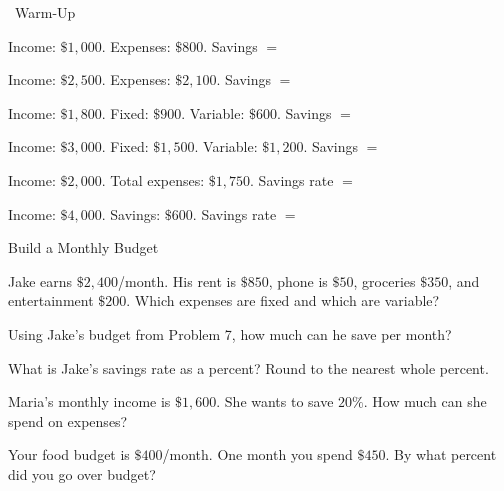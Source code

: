 \begin{practiceBox}[funGreen]{\faSun~Warm-Up}


\begin{multicols}{2}
\prob Income: $\$1{,}000$. Expenses: $\$800$. Savings $=$ \answerBlank[2cm]

\prob Income: $\$2{,}500$. Expenses: $\$2{,}100$. Savings $=$ \answerBlank[2cm]

\prob Income: $\$1{,}800$. Fixed: $\$900$. Variable: $\$600$. Savings $=$ \answerBlank[2cm]

\prob Income: $\$3{,}000$. Fixed: $\$1{,}500$. Variable: $\$1{,}200$. Savings $=$ \answerBlank[2cm]

\prob Income: $\$2{,}000$. Total expenses: $\$1{,}750$. Savings rate $=$ \answerBlank[2cm]

\prob Income: $\$4{,}000$. Savings: $\$600$. Savings rate $=$ \answerBlank[2cm]
\end{multicols}
\end{practiceBox}

\begin{practiceBox}{Build a Monthly Budget}

\prob Jake earns $\$2{,}400$/month. His rent is $\$850$, phone is $\$50$, groceries $\$350$, and entertainment $\$200$. Which expenses are fixed and which are variable? \answerBlank[5cm]

\prob Using Jake's budget from Problem 7, how much can he save per month? \answerBlank[3cm]

\prob What is Jake's savings rate as a percent? Round to the nearest whole percent. \answerBlank[3cm]

\prob Maria's monthly income is $\$1{,}600$. She wants to save $20\%$. How much can she spend on expenses? \answerBlank[3cm]

\prob Your food budget is $\$400$/month. One month you spend $\$450$. By what percent did you go over budget? \answerBlank[3cm]
\end{practiceBox}

